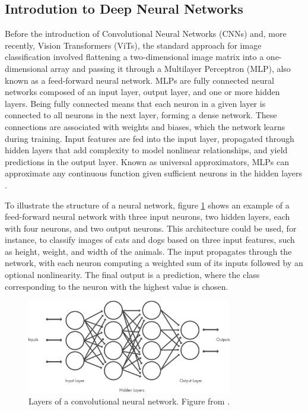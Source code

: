 \subsection{Introdution to Deep Neural Networks}
Before the introduction of Convolutional Neural Networks (CNNs) and, more recently, Vision Transformers (ViTs), the standard approach for image classification involved flattening a two-dimensional image matrix into a one-dimensional array and passing it through a Multilayer Perceptron (MLP), also known as a feed-forward neural network. MLPs are fully connected neural networks composed of an input layer, output layer, and one or more hidden layers. Being fully connected means that each neuron in a given layer is connected to all neurons in the next layer, forming a dense network. These connections are associated with weights and biases, which the network learns during training. Input features are fed into the input layer, propagated through hidden layers that add complexity to model nonlinear relationships, and yield predictions in the output layer. Known as universal approximators, MLPs can approximate any continuous function given sufficient neurons in the hidden layers \cite{zhang2023dive}.

To illustrate the structure of a neural network, figure \ref{fig:cnn_layers} shows an example of a feed-forward neural network with three input neurons, two hidden layers, each with four neurons, and two output neurons. This architecture could be used, for instance, to classify images of cats and dogs based on three input features, such as height, weight, and width of the animals. The input propagates through the network, with each neuron computing a weighted sum of its inputs followed by an optional nonlinearity. The final output is a prediction, where the class corresponding to the neuron with the highest value is chosen.

\begin{figure}[ht]
    \centering
    \includegraphics[width=0.8\textwidth]{Images/cnn_layers.jpg} 
    \caption{Layers of a convolutional neural network. Figure from \cite{mathworks_cnn}.}
    \label{fig:cnn_layers}
\end{figure}

